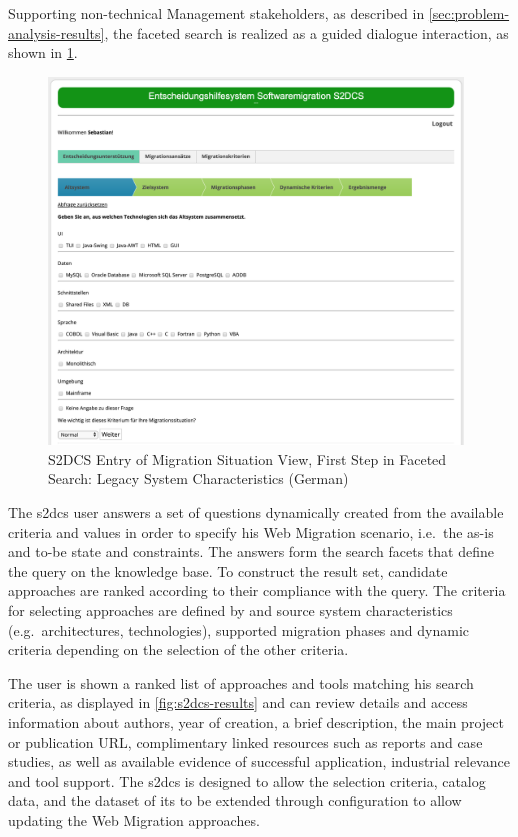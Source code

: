 Supporting non-technical Management stakeholders, as described in \cref{sec:problem-analysis-results}, the faceted search is realized as a guided dialogue interaction, as shown in \cref{fig:s2dcs}.
\begin{figure}[h!]
\hypertarget{fig:s2dcs}{%
\centering
\includegraphics[width=0.98\textwidth]{../figures/screenshots/s2dcs-query-new.png}
\caption[S2DCS Entry of Migration Situation ]{S2DCS Entry of Migration Situation View, First Step in Faceted Search: Legacy System Characteristics (German)}\label{fig:s2dcs}
}
\end{figure}
The \gls{s2dcs} user answers a set of questions dynamically created from the available criteria and values in order to specify his \gls{Web Migration} scenario, i.e.~the as-is and to-be state and constraints.
The answers form the search facets that define the query on the knowledge base.
To construct the result set, candidate approaches are ranked according to their compliance with the query.
The criteria for selecting approaches are defined by  and \gls{source system} characteristics (e.g.~architectures, technologies), supported migration phases and dynamic criteria depending on the selection of the other criteria.

The user is shown a ranked list of approaches and tools matching  his search criteria, as displayed in \cref{fig:s2dcs-results} and can review details and access information about authors, year of creation, a brief description, the main project or publication URL, complimentary linked resources such as reports and case studies, as well as available evidence of successful application, industrial relevance and tool support.
The \gls{s2dcs} is designed to allow the selection criteria, catalog data, and the dataset of its \knowledgebase to be extended through configuration to allow updating the \gls{Web Migration} approaches.

